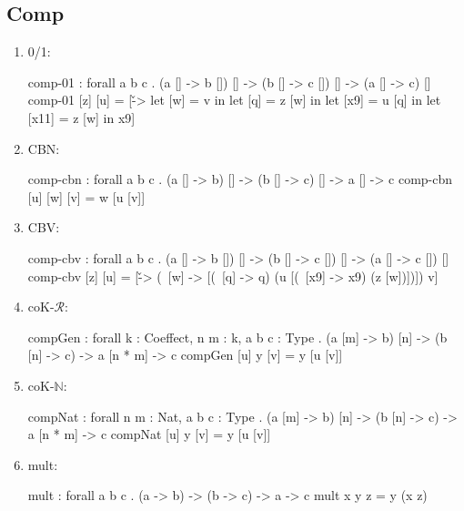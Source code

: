 \subsection{Comp}
\begin{enumerate}
\item 0/1: 
\begin{granule}
comp-01 : forall a b c  
        . (a [] -> b []) [] 
        -> (b [] -> c []) [] 
        -> (a [] -> c) []
comp-01 [z] [u] = 
    [\v -> 
        let [w] = v in 
        let [q] = z [w] in 
        let [x9] = u [q] in 
        let [x11] = z [w] in x9]
\end{granule}
\item CBN: 
\begin{granule}
comp-cbn : forall a b c  
         . (a [] -> b) [] 
         -> (b [] -> c) [] -> a [] -> c
comp-cbn [u] [w] [v] = w [u [v]]
\end{granule}
\item CBV: 
\begin{granule}
comp-cbv : forall a b c  . 
         (a [] -> b []) [] 
         -> (b [] -> c []) [] 
         -> (a [] -> c []) []
comp-cbv [z] [u] = 
    [\v -> 
        (\ [w] -> 
            [(\ [q] -> q) (u [(\ [x9] -> x9) (z [w])])]) v]
\end{granule}
\item coK-$\mathcal{R}$:
\begin{granule}
compGen : forall {k : Coeffect, n m : k, a b c : Type} 
        . (a [m] -> b) [n] 
        -> (b [n] -> c) 
        -> a [n * m] 
        -> c
compGen [u] y [v] = y [u [v]]
\end{granule}
\item coK-$\mathbb{N}$:
\begin{granule}
compNat : forall {n m : Nat, a b c : Type} 
     . (a [m] -> b) [n] 
     -> (b [n] -> c) 
     -> a [n * m] 
     -> c
compNat [u] y [v] = y [u [v]]
\end{granule}
\item mult:
\begin{granule}
mult : forall a b c  
     . (a -> b) 
     -> (b -> c) 
     -> a 
     -> c
mult x y z = y (x z)
\end{granule}
\end{enumerate}



